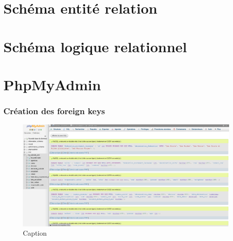 \section{Schéma entité relation}

\section{Schéma logique relationnel}

\section{PhpMyAdmin}
\subsubsection{Création des foreign keys}
\begin{figure}[H]
    \centering
    \includegraphics[width=15cm]{Appendix/phpmyadmin_creation_table.png}
    \caption{Caption}
    \label{fig:pmy_creation_fk}
\end{figure}
